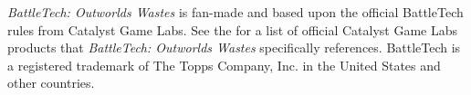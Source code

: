 \emph{BattleTech: Outworlds Wastes} is fan-made and based upon the official BattleTech rules from Catalyst Game Labs.
See the  for a list of official Catalyst Game Labs products that \emph{BattleTech: Outworlds Wastes} specifically references.
BattleTech is a registered trademark of The Topps Company, Inc. in the United States and other countries.
